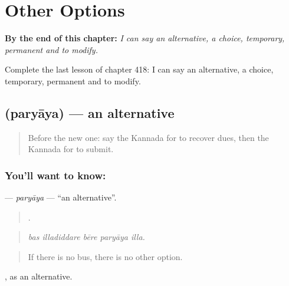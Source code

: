 
\chapter{Other Options}
\label{ch:ka-other-options}

\begin{chapteropening}
\textbf{By the end of this chapter:} \emph{I can say an alternative, a choice, temporary, permanent and to modify.}

Complete the last lesson of chapter 418: I can say an alternative, a choice, temporary, permanent and to modify.
\end{chapteropening}

\section[\texorpdfstring{\kn{ಪರ್ಯಾಯ} (paryāya)}{ಪರ್ಯಾಯ (paryāya)}]{ (paryāya) — an alternative}

\label{lesson:KA-C418-paryaya}



\begin{quote}
Before the new one: say the Kannada for to recover dues, then the Kannada for to submit.
\end{quote}

\subsection*{You'll want to know: }
\textbf{} — \emph{paryāya} — \textquotedblleft{}an alternative\textquotedblright{}.

\begin{quote}
    .
\end{quote}

\begin{quote}
\emph{bas illadiddare bēre paryāya illa.}
\end{quote}

\begin{quote}
If there is no bus, there is no other option.
\end{quote}

, as an alternative.

